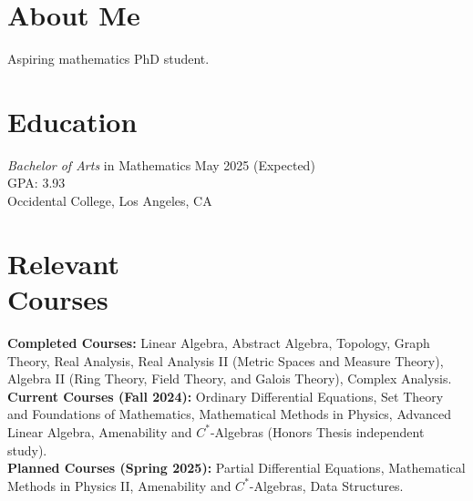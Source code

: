\documentclass[margin, 12pt]{res} %
\begin{document}
\begin{resume}

\section{\sc About Me}
Aspiring mathematics PhD student.

\section{\sc Education}

{\sl Bachelor of Arts} in Mathematics \hfill May 2025 (Expected) \\
GPA: 3.93\\
Occidental College, Los Angeles, CA 
\section{\sc Relevant \\ Courses}

\textbf{Completed Courses:} Linear Algebra, Abstract Algebra, Topology, Graph Theory, Real Analysis, Real Analysis II (Metric Spaces and Measure Theory), Algebra II (Ring Theory, Field Theory, and Galois Theory), Complex Analysis.\\

\textbf{Current Courses (Fall 2024):} Ordinary Differential Equations, Set Theory and Foundations of Mathematics, Mathematical Methods in Physics, Advanced Linear Algebra, Amenability and $C^{\ast}$-Algebras (Honors Thesis independent study).\\

\textbf{Planned Courses (Spring 2025):} Partial Differential Equations, Mathematical Methods in Physics II, Amenability and $C^{\ast}$-Algebras, Data Structures.

\end{resume}
\end{document}
